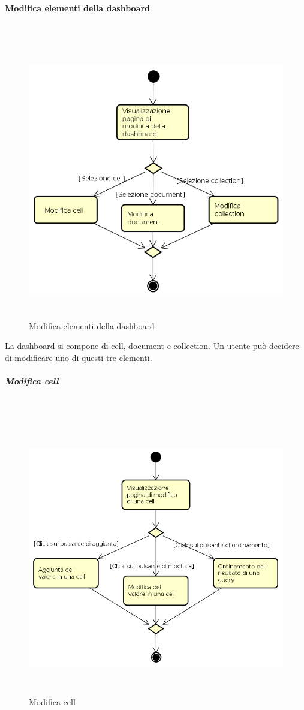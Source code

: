 \paragraph{Modifica elementi della dashboard} \mbox{} \\
\begin{figure}[H]
\begin{center}
\includegraphics[height=12cm]{res/sections/backend/activities/modificaElementDashboard.png}
\caption{Modifica elementi della dashboard}
\end{center}
\end{figure}
La dashboard si compone di cell, document e collection. Un utente può decidere di modificare uno di questi tre elementi.
\subparagraph{Modifica cell} \mbox{} \\
\begin{figure}[H]
\begin{center}
\includegraphics[height=12cm]{res/sections/backend/activities/modificaCell.png}
\caption{Modifica cell}
\end{center}
\end{figure}

